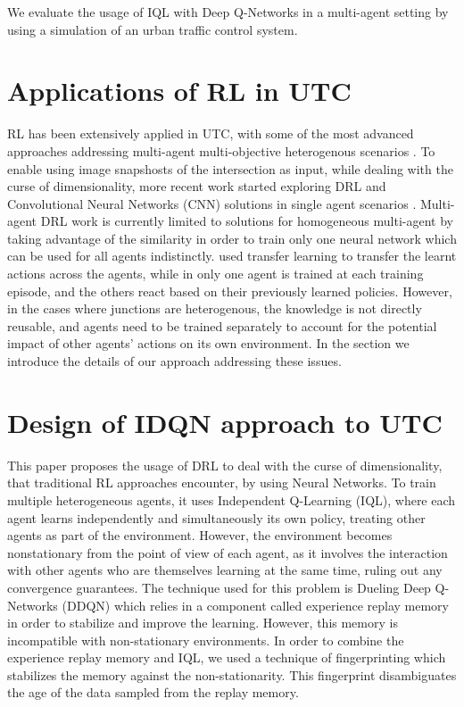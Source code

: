 \documentclass{llncs}
\begin{document}
We evaluate the usage of IQL with Deep Q-Networks in a multi-agent setting by using a simulation of an urban traffic control system.


\section{Applications of RL in UTC}

RL has been extensively applied in UTC, with some of the most advanced approaches addressing multi-agent multi-objective heterogenous scenarios \cite{Dusparic2016, El-Tantawy2012}. To enable using image snapshosts of the intersection as input, while dealing with the curse of dimensionality, more recent work started exploring DRL and Convolutional Neural Networks (CNN) solutions in single agent scenarios \cite{Mousavi2017,Liang2018}. Multi-agent DRL work is currently limited to solutions for homogeneous multi-agent by taking advantage of the similarity in order to train only one neural network which can be used for all agents indistinctly.\cite{VanDerPol2016} used transfer learning to transfer the learnt actions across the agents, while in \cite{Liu2017CooperativeDR} only one agent is trained at each training episode, and the others react based on their previously learned policies. However, in the cases where junctions are heterogenous, the knowledge is not directly reusable, and agents need to be trained separately to account for the potential impact of other agents' actions on its own environment. In the section we introduce the details of our approach addressing these issues. 

\section{Design of IDQN approach to UTC}

This paper proposes the usage of DRL to deal with the curse of dimensionality, that traditional RL approaches encounter, by using Neural Networks. To train multiple heterogeneous agents, it uses Independent Q-Learning (IQL), where each agent learns independently and simultaneously its own policy, treating other agents as part of the environment. However, the environment becomes nonstationary from the point of view of each agent, as it involves the interaction with other agents who are themselves learning at the same time, ruling out any convergence guarantees. The technique used for this problem is Dueling Deep Q-Networks (DDQN) which relies in a component called experience replay memory in order to stabilize and improve the learning. However, this memory is incompatible with non-stationary environments. In order to combine the experience replay memory and IQL, we used a technique of fingerprinting which stabilizes the memory against the non-stationarity. This fingerprint disambiguates the age of the data sampled from the replay memory. 
\end{document}
